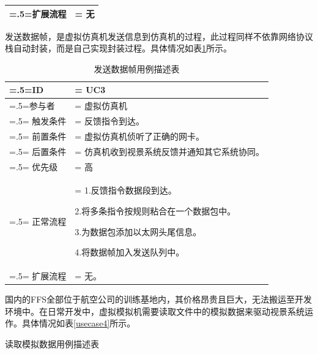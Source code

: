 {\begin{table}[htbp]
\begin{center}
\begin{tabularx}{0.8\textwidth}{ 
            | >{\centering\arraybackslash\hsize=.5\hsize\linewidth=\hsize}X 
            | >{\raggedright\arraybackslash\hsize=1.5\hsize\linewidth=\hsize}X 
            | }
            \hline
            扩展流程 & 无\\
            \hline
        \end{tabularx}
    \end{center}
\end{table}
\par
发送数据帧，是虚拟仿真机发送信息到仿真机的过程，此过程同样不依靠网络协议栈自动封装，而是自己实现封装过程。具体情况如表\ref{usecase3}所示。
\begin{table}[htbp]
    \begin{center}
        \caption{发送数据帧用例描述表}
        \label{usecase3}
        \renewcommand\arraystretch{1.5}
        \begin{tabularx}{0.8\textwidth}{ 
            | >{\centering\arraybackslash\hsize=.5\hsize\linewidth=\hsize}X 
            | >{\raggedright\arraybackslash\hsize=1.5\hsize\linewidth=\hsize}X 
            | }
            \hline
            \textbf{ID} & \textbf{UC3}\\
            \hline
            参与者 & 虚拟仿真机\\
            \hline
            触发条件 & 反馈指令到达。\\
            \hline
            前置条件 & 虚拟仿真机侦听了正确的网卡。\\
            \hline
            后置条件 & 仿真机收到视景系统反馈并通知其它系统协同。\\
            \hline
            优先级 & 高\\
            \hline
            正常流程 & 1.反馈指令数据段到达。\par 2.将多条指令按规则粘合在一个数据包中。\par 3.为数据包添加以太网头尾信息。\par 4.将数据帧加入发送队列中。\\
            \hline
            扩展流程 & 无。\\
            \hline
        \end{tabularx}
    \end{center}
\end{table}
\par
国内的FFS全部位于航空公司的训练基地内，其价格昂贵且巨大，无法搬运至开发环境中。在日常开发中，虚拟模拟机需要读取文件中的模拟数据来驱动视景系统运作。具体情况如表\ref{usecase4}所示。
\begin{table}[htbp]
    \begin{center}
        \caption{读取模拟数据用例描述表}
        \label{usecase4}
        \renewcommand\arraystretch{1.5}

\end{center}
\end{table}}
